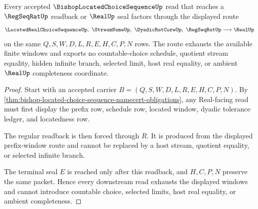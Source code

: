 \begin{theorem}
\label{thm:bishop-located-choice-sequence-window-exhaustion}
Every accepted $\BishopLocatedChoiceSequenceUp$ read that reaches a $\RegSeqRatUp$ readback or $\RealUp$ seal factors through the displayed route
$$
\LocatedRealChoiceSequenceUp,\ \StreamNameUp,\ \DyadicRatCoreUp,\ \RegSeqRatUp \longrightarrow \RealUp
$$
on the same $Q,S,W,D,L,R,E,H,C,P,N$ rows. The route exhausts the available finite windows and exports no countable-choice schedule, quotient stream equality, hidden infinite branch, selected limit, host real equality, or ambient $\RealUp$ completeness coordinate.
\end{theorem}
\begin{proof}
Start with an accepted carrier $B=(Q,S,W,D,L,R,E,H,C,P,N)$. By \autoref{thm:bishop-located-choice-sequence-namecert-obligations}, any Real-facing read must first display the prefix row, schedule row, located window, dyadic tolerance ledger, and locatedness row.

The regular readback is then forced through $R$. It is produced from the displayed prefix-window route and cannot be replaced by a host stream, quotient equality, or selected infinite branch.

The terminal seal $E$ is reached only after this readback, and $H,C,P,N$ preserve the same packet. Hence every downstream read exhausts the displayed windows and cannot introduce countable choice, selected limits, host real equality, or ambient completeness.
\end{proof}




